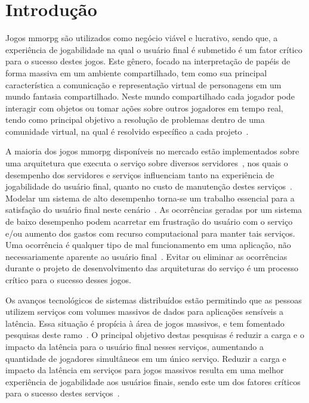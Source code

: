 \chapter{Introdução}
\label{introducao}


Jogos \acf{mmorpg} são utilizados como negócio viável e lucrativo, sendo que, a experiência de jogabilidade na qual o usuário final é submetido é um fator crítico para o sucesso destes jogos.
%
Este gênero, focado na interpretação de papéis de forma massiva em um ambiente compartilhado, tem como sua principal característica a comunicação e representação virtual de personagens em um mundo fantasia compartilhado.
%
Neste mundo compartilhado cada jogador pode interagir com objetos ou tomar ações sobre outros jogadores em tempo real, tendo como principal objetivo a resolução de problemas dentro de uma comunidade virtual, na qual é resolvido específico a cada projeto~\cite{video_game_technologies}.



A maioria dos jogos \ac{mmorpg} disponíveis no mercado estão implementados sobre uma arquitetura que executa o serviço sobre diversos servidores~\cite{stephenclarkewillson2017}, nos quais o desempenho dos servidores e serviços influenciam tanto na experiência de jogabilidade do usuário final, quanto no custo de manutenção destes serviços~\cite{1417630}.
%
Modelar um sistema de alto desempenho torna-se um trabalho essencial para a satisfação do usuário final neste cenário~\cite{1417630}.
%
As ocorrências geradas por um sistema de baixo desempenho podem acarretar em frustração do usuário com o serviço e/ou aumento dos gastos com recurso computacional para manter tais serviços.
%
Uma ocorrência é qualquer tipo de mal funcionamento em uma aplicação, não necessariamente aparente ao usuário final~\cite{1417630}.
%
Evitar ou eliminar as ocorrências durante o projeto de desenvolvimento das arquiteturas do serviço é um processo crítico para o sucesso desses jogos.


Os avanços tecnológicos de sistemas distribuídos estão permitindo que as pessoas utilizem serviços com volumes massivos de dados para aplicações sensíveis a latência.
%
Essa situação é propícia à área de jogos massivos, e tem fomentado pesquisas deste ramo~\cite{mmo_analytic,1417630,6267019,6063041}.
%
O principal objetivo destas pesquisas é reduzir a carga e o impacto da latência para o usuário final nesses serviços, aumentando a quantidade de jogadores simultâneos em um único serviço.
%
Reduzir a carga e impacto da latência em serviços para jogos massivos resulta em uma melhor experiência de jogabilidade aos usuários finais, sendo este um dos fatores críticos para o sucesso destes serviços~\cite{1417630}.


